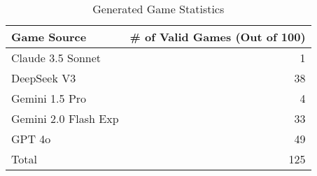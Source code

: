 \begin{table}[!ht]
    \centering
    \begin{tabular}{lr}
    \toprule
    Game Source & \# of Valid Games (Out of 100)\\
    \midrule
    Claude 3.5 Sonnet & 1\\
    DeepSeek V3       & 38\\
    Gemini 1.5 Pro    & 4\\
    Gemini 2.0 Flash Exp & 33\\
    GPT 4o            & 49\\
    \midrule
    Total             & 125 \\
    \bottomrule
    \end{tabular}
    \caption{Generated Game Statistics}
    \label{tab:data_stats}
\end{table}
